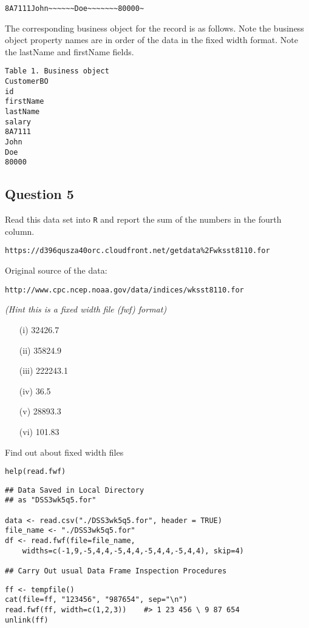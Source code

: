 \documentclass[12pt]{article}
\begin{document}
\begin{verbatim}
8A7111John~~~~~~Doe~~~~~~~80000~
\end{verbatim}
The corresponding business object for the record is as follows. Note the business object property names are in order of the data in the fixed width format. Note the lastName and firstName fields.

\begin{verbatim}
Table 1. Business object
CustomerBO
id
firstName
lastName
salary
8A7111
John
Doe
80000
\end{verbatim}
\newpage
\subsection*{Question 5}
Read this data set into \texttt{R} and report the sum of the numbers in the fourth column. 
\begin{verbatim}
https://d396qusza40orc.cloudfront.net/getdata%2Fwksst8110.for 
\end{verbatim} 

\noindent Original source of the data:
\begin{verbatim}
http://www.cpc.ncep.noaa.gov/data/indices/wksst8110.for 
\end{verbatim} 

\noindent \textit{(Hint this is a fixed width file (fwf) format)}
\begin{itemize}
\item[(i)] 32426.7
\item[(ii)] 35824.9
\item[(iii)] 222243.1
\item[(iv)] 36.5
\item[(v)] 28893.3
\item[(vi)] 101.83
\end{itemize}

\begin{framed}
\noindent Find out about fixed width files
\begin{verbatim}
help(read.fwf)
\end{verbatim}	
\end{framed}

\begin{framed}
\begin{verbatim}
## Data Saved in Local Directory
## as "DSS3wk5q5.for"

data <- read.csv("./DSS3wk5q5.for", header = TRUE)
file_name <- "./DSS3wk5q5.for"
df <- read.fwf(file=file_name,
    widths=c(-1,9,-5,4,4,-5,4,4,-5,4,4,-5,4,4), skip=4)

## Carry Out usual Data Frame Inspection Procedures
\end{verbatim}	
\end{framed}

\begin{framed}
\begin{verbatim}
ff <- tempfile()
cat(file=ff, "123456", "987654", sep="\n")
read.fwf(ff, width=c(1,2,3))    #> 1 23 456 \ 9 87 654
unlink(ff)
\end{verbatim}
\end{framed}
\end{document}
